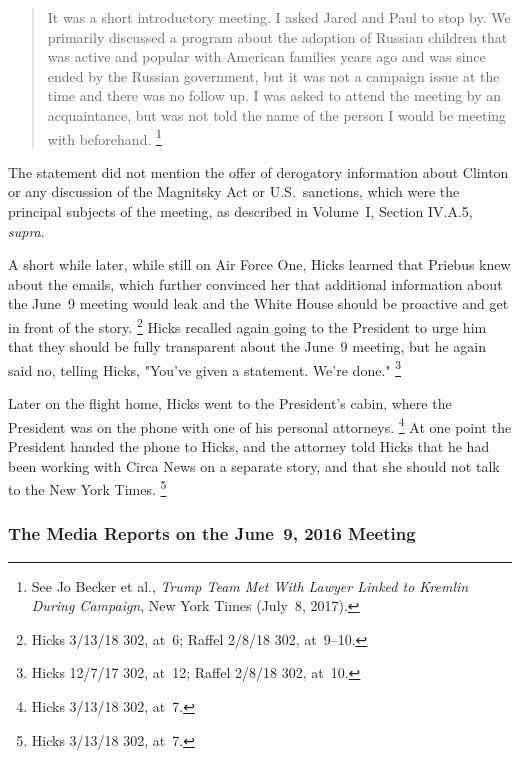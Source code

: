 \begin{quote}
It was a short introductory meeting.
I asked Jared and Paul to stop by.
We primarily discussed a program about the adoption of Russian children that was active and popular with American families years ago and was since ended by the Russian government, but it was not a campaign issue at the time and there was no follow up.
I was asked to attend the meeting by an acquaintance, but was not told the name of the person I would be meeting with beforehand.%
\footnote{See Jo Becker et al., \textit{Trump Team Met With Lawyer Linked to Kremlin During Campaign}, New York Times (July~8, 2017).}
\end{quote}

The statement did not mention the offer of derogatory information about Clinton or any discussion of the Magnitsky Act or U.S.~sanctions, which were the principal subjects of the meeting, as described in Volume~I, Section IV.A.5, \textit{supra}.

A short while later, while still on Air Force One, Hicks learned that Priebus knew about the emails, which further convinced her that additional information about the June~9 meeting would leak and the White House should be proactive and get in front of the story.%
\footnote{Hicks 3/13/18 302, at~6;
Raffel 2/8/18 302, at~9--10.}
Hicks recalled again going to the President to urge him that they should be fully transparent about the June~9 meeting, but he again said no, telling Hicks, "You've given a statement.
We're done."%
\footnote{Hicks 12/7/17 302, at~12;
Raffel 2/8/18 302, at~10.}

Later on the flight home, Hicks went to the President's cabin, where the President was on the phone with one of his personal attorneys.%
\footnote{Hicks 3/13/18 302, at~7.}
At one point the President handed the phone to Hicks, and the attorney told Hicks that he had been working with Circa News on a separate story, and that she should not talk to the New York Times.%
\footnote{Hicks 3/13/18 302, at~7.}

\subsubsection{The Media Reports on the June~9, 2016 Meeting}

